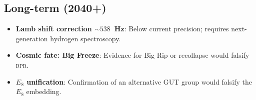 \documentclass[aps,prd,twocolumn,superscriptaddress,longbibliography,nofootinbib]{revtex4-2}
\newcommand{\bpr}{\textsc{bpr}}
\begin{document}
\subsection{Long-term (2040+)}

\begin{itemize}
\item \textbf{Lamb shift correction $\sim 538$~Hz}: Below current
  precision; requires next-generation hydrogen spectroscopy.

\item \textbf{Cosmic fate: Big Freeze}: Evidence for Big Rip or
  recollapse would falsify \bpr.

\item \textbf{$E_8$ unification}: Confirmation of an alternative
  GUT group would falsify the $E_8$ embedding.
\end{itemize}


\end{document}
